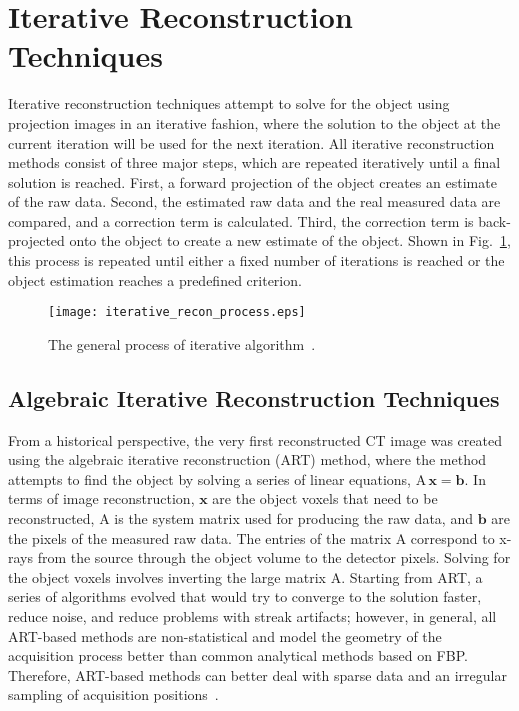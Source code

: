 \section{Iterative Reconstruction Techniques}
Iterative reconstruction techniques attempt to solve for the object using projection images in an iterative fashion, where the solution to the object at the current iteration will be used for the next iteration.  All iterative reconstruction methods consist of three major steps, which are repeated iteratively until a final solution is reached.  First, a forward projection of the object creates an estimate of the raw data.  Second, the estimated raw data and the real measured data are compared, and a correction term is calculated.  Third, the correction term is back-projected onto the object to create a new estimate of the object.  Shown in Fig.~\ref{fig:generalIR}, this process is repeated until either a fixed number of iterations is reached or the object estimation reaches a predefined criterion.
%
\begin{figure}
\centering
\texttt{[image: iterative\_recon\_process.eps]}
\caption{The general process of iterative algorithm~\citep{Beister2012}.}
\label{fig:generalIR}
\end{figure}

\subsection{Algebraic Iterative Reconstruction Techniques}
From a historical perspective, the very first reconstructed CT image was created using the algebraic iterative reconstruction (ART) method, where the method attempts to find the object by solving a series of linear equations, $\mathrm{A\,\mathbf{x} = \mathbf{b}}$.  In terms of image reconstruction, $\mathrm{\mathbf{x}}$ are the object voxels that need to be reconstructed, $\mathrm{A}$ is the system matrix used for producing the raw data, and $\mathrm{\mathbf{b}}$ are the pixels of the measured raw data.  The entries of the matrix $\mathrm{A}$ correspond to x-rays from the source through the object volume to the detector pixels.  Solving for the object voxels involves inverting the large matrix A.  Starting from ART, a series of algorithms evolved that would try to converge to the solution faster, reduce noise, and reduce problems with streak artifacts; however, in general, all ART-based methods are non-statistical and model the geometry of the acquisition process better than common analytical methods based on FBP.  Therefore, ART-based methods can better deal with sparse data and an irregular sampling of acquisition positions~\citep{Beister2012}.

